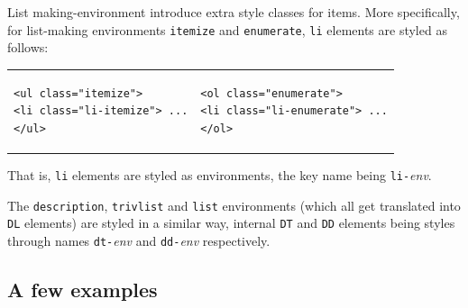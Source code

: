 List making-environment introduce extra style classes for items.
More specifically, for list-making environments
\texttt{itemize} and \texttt{enumerate},
\verb+li+ elements are styled as follows:
\begin{center}
\begin{tabular}{p{.4\linewidth}p{\linewidth}}
\begin{verbatim}
<ul class="itemize">
<li class="li-itemize"> ...
</ul>
\end{verbatim}
&
\begin{verbatim}
<ol class="enumerate">
<li class="li-enumerate"> ...
</ol>
\end{verbatim}
\end{tabular}
\end{center}
That is, \verb+li+ elements are styled as environments, the key name
being \texttt{li-}\textit{env}.

The \texttt{description}, \texttt{trivlist} and \texttt{list} environments
(which all get translated into \texttt{DL} elements) are styled in
a similar way, internal \texttt{DT} and \texttt{DD} elements being
styles through names \texttt{dt-}\textit{env} and
\texttt{dd-}\textit{env} respectively.

\subsection{A few examples}
